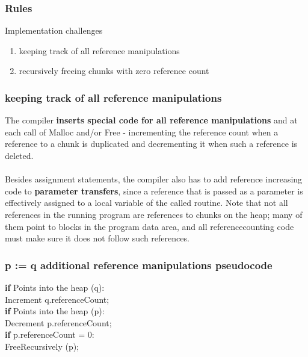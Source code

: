 \documentclass[presentation]{beamer}
\begin{document}
\begin{frame}
  \frametitle{Rules}
  \justifying
    \begin{block}{Implementation challenges}
        \begin{enumerate}
            \item keeping track of all
reference manipulations
            \item  recursively freeing chunks with zero reference count
        \end{enumerate}
  	\end{block}
\end{frame}

\begin{frame}
  \frametitle{keeping track of all
reference manipulations}
  \justifying  
  The compiler \textbf{inserts special code for all reference manipulations} and at each call of Malloc and/or Free - incrementing
the reference count when a reference to a chunk is duplicated and decrementing it
when such a reference is deleted. 
	\\~\\
	Besides assignment statements,
the compiler also has to add reference increasing code to \textbf{parameter transfers}, since
a reference that is passed as a parameter is effectively assigned to a local variable of
the called routine. Note that not all references in the running program are references to chunks on
the heap; many of them point to blocks in the program data area, and all referencecounting code must make sure it does not follow such references.
\end{frame}


\begin{frame}
  \frametitle{p := q additional reference manipulations pseudocode}
  \justifying
  \begin{block}{}
  \textbf{if} Points into the heap (q):\\ \hspace*{20pt} Increment q.referenceCount;\\ \textbf{if} Points into the heap (p):\\ \hspace*{20pt} Decrement p.referenceCount;\\ \hspace*{20pt} \textbf{if} p.referenceCount = 0:\\ \hspace*{40pt} FreeRecursively (p);
  \end{block}
\end{frame}  
\end{document}
